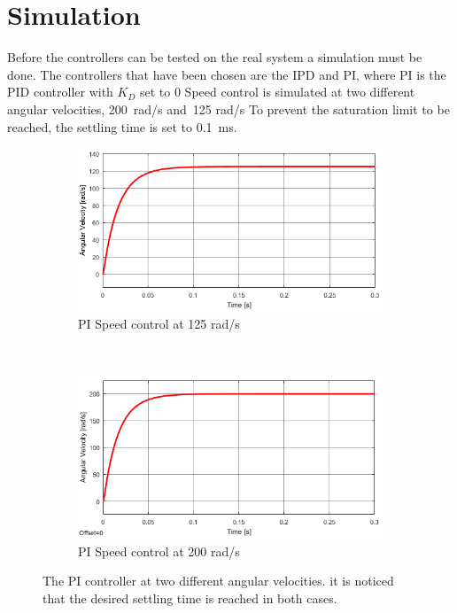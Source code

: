 \section{Simulation}
Before the controllers can be tested on the real system a simulation must be done. The controllers that have been chosen are the IPD and PI, where PI is the PID controller with $K_D$ set to 0 Speed control is simulated at two different angular velocities, 200~rad/s and~125 rad/s To prevent the saturation limit to be reached, the settling time is set to 0.1~ms.

\begin{figure}[h!]
	\centering
	\begin{subfigure}[b]{0.45\textwidth}
		\includegraphics[width=\textwidth]{graphics/PI_single125}
		\caption{PI Speed control at 125 rad/s}
		\label{fig:pisingle125}
	\end{subfigure}
	~ %
	\begin{subfigure}[b]{0.45\textwidth}
		\includegraphics[width=\textwidth]{graphics/PI_single200}
		\caption{PI Speed control at 200 rad/s}
		\label{fig:pisingle200}
	\end{subfigure}
	\caption{The PI controller at two different angular velocities. it is noticed that the desired settling time is reached in both cases.}\label{fig:pisingle}
\end{figure}



